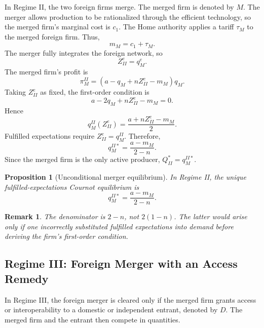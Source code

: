 \documentclass[12pt]{article}
\newtheorem{proposition}{Proposition}
\newtheorem{remark}{Remark}
\begin{document}
In Regime II, the two foreign firms merge. The merged firm is denoted by $M$. The merger allows production to be rationalized through the efficient technology, so the merged firm's marginal cost is $c_1$. The Home authority applies a tariff $\tau_M$ to the merged foreign firm. Thus,
\begin{equation}
m_M=c_1+\tau_M.
\label{eq:mM_regime_II}
\end{equation}
The merger fully integrates the foreign network, so
\begin{equation}
Z_{II}^e=q_M^e.
\label{eq:network_regime_II}
\end{equation}
The merged firm's profit is
\begin{equation}
\pi_M^{II}=(a-q_M+nZ_{II}^e-m_M)q_M.
\label{eq:profit_regime_II}
\end{equation}
Taking $Z_{II}^e$ as fixed, the first-order condition is
\begin{equation}
a-2q_M+nZ_{II}^e-m_M=0.
\label{eq:foc_regime_II}
\end{equation}
Hence
\begin{equation}
q_M^{II}(Z_{II}^e)=\frac{a+nZ_{II}^e-m_M}{2}.
\end{equation}
Fulfilled expectations require $Z_{II}^e=q_M^{II}$. Therefore,
\begin{equation}
q_M^{II*}=\frac{a-m_M}{2-n}.
\label{eq:qM_regime_II_star}
\end{equation}
Since the merged firm is the only active producer, $Q_{II}^*=q_M^{II*}$.

\begin{proposition}[Unconditional merger equilibrium]
In Regime II, the unique fulfilled-expectations Cournot equilibrium is
\begin{equation}
q_M^{II*}=\frac{a-m_M}{2-n}.
\end{equation}
\end{proposition}

\begin{remark}
The denominator is $2-n$, not $2(1-n)$. The latter would arise only if one incorrectly substituted fulfilled expectations into demand before deriving the firm's first-order condition.
\end{remark}

\subsection{Regime III: Foreign Merger with an Access Remedy}

In Regime III, the foreign merger is cleared only if the merged firm grants access or interoperability to a domestic or independent entrant, denoted by $D$. The merged firm and the entrant then compete in quantities.
\end{document}
